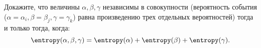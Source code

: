 Докажите, что величины $\alpha, \beta, \gamma$ независимы в совокупности (вероятность события
($\alpha = \alpha_i, \beta = \beta_j, \gamma = \gamma_k$) равна произведению трех отдельных вероятностей)
тогда и только тогда, когда:
$$
    \entropy(\alpha, \beta, \gamma) = \entropy(\alpha) + \entropy(\beta) + \entropy(\gamma).
$$